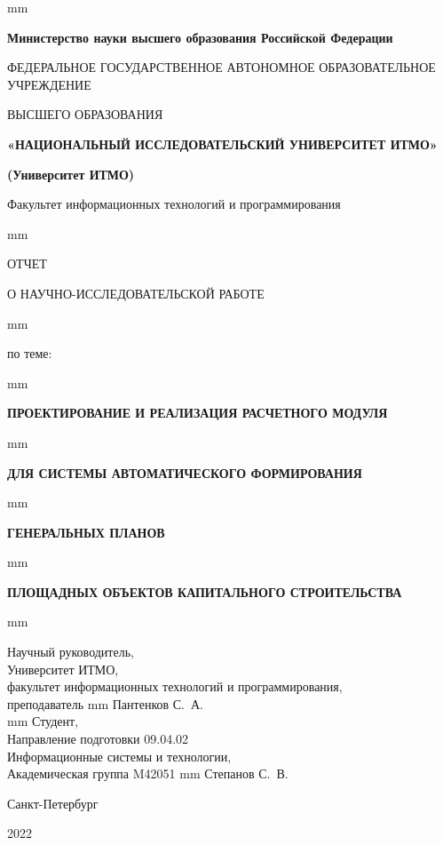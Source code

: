 \thispagestyle{empty}
 mm
\centerline{\footnotesize{\bf{Министерство науки высшего образования Российской Федерации}}}
\centerline{\footnotesize{{ФЕДЕРАЛЬНОЕ ГОСУДАРСТВЕННОЕ АВТОНОМНОЕ ОБРАЗОВАТЕЛЬНОЕ УЧРЕЖДЕНИЕ}}}
\centerline{\small{{ВЫСШЕГО ОБРАЗОВАНИЯ}}}
\centerline{{\bf{«НАЦИОНАЛЬНЫЙ ИССЛЕДОВАТЕЛЬСКИЙ УНИВЕРСИТЕТ ИТМО»}}}
\centerline{{\bf{(Университет ИТМО)}}}
\centerline{Факультет информационных технологий и программирования}

 mm
\centerline{\LARGE{ОТЧЕТ}}
\centerline{\LARGE{О НАУЧНО-ИССЛЕДОВАТЕЛЬСКОЙ РАБОТЕ}}
 mm
\centerline{\large{по теме:}}
 mm
\centerline{\large\bf{ПРОЕКТИРОВАНИЕ И РЕАЛИЗАЦИЯ РАСЧЕТНОГО МОДУЛЯ}}
 mm
\centerline{\large\bf{ДЛЯ СИСТЕМЫ АВТОМАТИЧЕСКОГО ФОРМИРОВАНИЯ}}
 mm
\centerline{\large\bf{ГЕНЕРАЛЬНЫХ ПЛАНОВ}}
 mm
\centerline{\large\bf{ПЛОЩАДНЫХ ОБЪЕКТОВ КАПИТАЛЬНОГО СТРОИТЕЛЬСТВА}}
 mm
\large{
\noindent
Научный руководитель, \\
Университет ИТМО, \\
факультет информационных технологий и программирования, \\
преподаватель  mm Пантенков С.~А.\\
 mm \noindent
Студент, \\
Направление подготовки 09.04.02 \\
Информационные системы и технологии, \\
Академическая группа M42051  mm Степанов С.~В.\\
\vfill \hfil \break
\centerline{\large Санкт-Петербург } \centerline{ 2022 }}
\newpage
